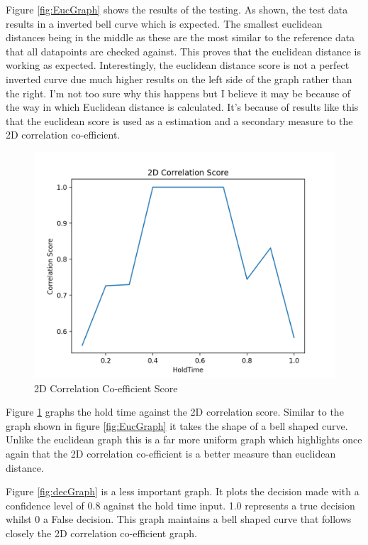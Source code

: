 \documentclass[10pt,a4paper]{report}
\begin{document}
Figure \ref{fig:EucGraph} shows the results of the testing. As shown, the test data results in a inverted bell curve which is expected. The smallest euclidean distances being in the middle as these are the most similar to the reference data that all datapoints are checked against. This proves that the euclidean distance is working as expected. Interestingly, the euclidean distance score is not a perfect inverted curve due much higher results on the left side of the graph rather than the right. I'm not too sure why this happens but I believe it may be because of the way in which Euclidean distance is calculated. It's because of results like this that the euclidean score is used as a estimation and a secondary measure to the 2D correlation co-efficient.

\begin{figure}
	\centering
	\includegraphics[scale=0.6]{CorrGraph}
	\caption{2D Correlation Co-efficient Score}
	\label{fig:2DGraph}
\end{figure}

Figure \ref{fig:2DGraph} graphs the hold time against the 2D correlation score. Similar to the graph shown in figure \ref{fig:EucGraph} it takes the shape of a bell shaped curve. Unlike the euclidean graph this is a far more uniform graph which highlights once again that the 2D correlation co-efficient is a better measure than euclidean distance.

Figure \ref{fig:decGraph} is a less important graph. It plots the decision made with a confidence level of 0.8 against the hold time input. 1.0 represents a true decision whilst 0 a False decision. This graph maintains a bell shaped curve that follows closely the 2D correlation co-efficient graph.
\end{document}
